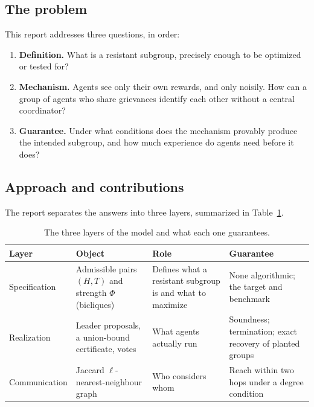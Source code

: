 \documentclass[11pt]{article}
\theoremstyle{plain}
\theoremstyle{definition}
\theoremstyle{remark}
\begin{document}
\subsection{The problem}
This report addresses three questions, in order:
\begin{enumerate}[label=\textbf{Q\arabic*.},leftmargin=2.5em]
    \item \textbf{Definition.} What is a resistant subgroup, precisely enough to be optimized or tested for?
    \item \textbf{Mechanism.} Agents see only their own rewards, and only noisily. How can a group of agents who
          share grievances identify each other without a central coordinator?
    \item \textbf{Guarantee.} Under what conditions does the mechanism provably produce the intended subgroup, and how much
          experience do agents need before it does?
\end{enumerate}
 
\subsection{Approach and contributions}
The report separates the answers into three layers, summarized in Table~\ref{tab:layers}.
 
\begin{table}[h]
\centering
\begin{tabular}{@{}p{2.6cm}p{4.1cm}p{3.4cm}p{3.9cm}@{}}
\toprule
\textbf{Layer} & \textbf{Object} & \textbf{Role} & \textbf{Guarantee} \\
\midrule
Specification & Admissible pairs $(H,T)$ and strength $\Phi$ (bicliques) & Defines what a resistant subgroup is and what to maximize & None algorithmic; the target and benchmark \\
Realization & Leader proposals, a union-bound certificate, votes & What agents actually run & Soundness; termination; exact recovery of planted groups \\
Communication & Jaccard $\ell$-nearest-neighbour graph & Who considers whom & Reach within two hops under a degree condition \\
\bottomrule
\end{tabular}
\caption{The three layers of the model and what each one guarantees.}
\label{tab:layers}
\end{table}
 
\end{document}
